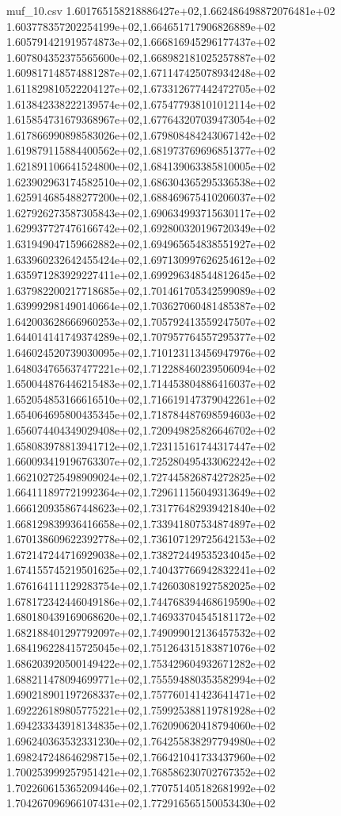 \begin{filecontents*}{muf_10.csv}
1.601765158218886427e+02,1.662486498872076481e+02
1.603778357202254199e+02,1.664651717906826889e+02
1.605791421919574873e+02,1.666816945296177437e+02
1.607804352375565600e+02,1.668982181025257887e+02
1.609817148574881287e+02,1.671147425078934248e+02
1.611829810522204127e+02,1.673312677442472705e+02
1.613842338222139574e+02,1.675477938101012114e+02
1.615854731679368967e+02,1.677643207039473054e+02
1.617866990898583026e+02,1.679808484243067142e+02
1.619879115884400562e+02,1.681973769696851377e+02
1.621891106641524800e+02,1.684139063385810005e+02
1.623902963174582510e+02,1.686304365295336538e+02
1.625914685488277200e+02,1.688469675410206037e+02
1.627926273587305843e+02,1.690634993715630117e+02
1.629937727476166742e+02,1.692800320196720349e+02
1.631949047159662882e+02,1.694965654838551927e+02
1.633960232642455424e+02,1.697130997626254612e+02
1.635971283929227411e+02,1.699296348544812645e+02
1.637982200217718685e+02,1.701461705342599089e+02
1.639992981490140664e+02,1.703627060481485387e+02
1.642003628666960253e+02,1.705792413559247507e+02
1.644014141749374289e+02,1.707957764557295377e+02
1.646024520739030095e+02,1.710123113456947976e+02
1.648034765637477221e+02,1.712288460239506094e+02
1.650044876446215483e+02,1.714453804886416037e+02
1.652054853166616510e+02,1.716619147379042261e+02
1.654064695800435345e+02,1.718784487698594603e+02
1.656074404349029408e+02,1.720949825826646702e+02
1.658083978813941712e+02,1.723115161744317447e+02
1.660093419196763307e+02,1.725280495433062242e+02
1.662102725498909024e+02,1.727445826874272825e+02
1.664111897721992364e+02,1.729611156049313649e+02
1.666120935867448623e+02,1.731776482939421840e+02
1.668129839936416658e+02,1.733941807534874897e+02
1.670138609622392778e+02,1.736107129725642153e+02
1.672147244716929038e+02,1.738272449535234045e+02
1.674155745219501625e+02,1.740437766942832241e+02
1.676164111129283754e+02,1.742603081927582025e+02
1.678172342446049186e+02,1.744768394468619590e+02
1.680180439169068620e+02,1.746933704545181172e+02
1.682188401297792097e+02,1.749099012136457532e+02
1.684196228415725045e+02,1.751264315183871076e+02
1.686203920500149422e+02,1.753429604932671282e+02
1.688211478094699771e+02,1.755594880353582994e+02
1.690218901197268337e+02,1.757760141423641471e+02
1.692226189805775221e+02,1.759925388119781928e+02
1.694233343918134835e+02,1.762090620418794060e+02
1.696240363532331230e+02,1.764255838297794980e+02
1.698247248646298715e+02,1.766421041733437960e+02
1.700253999257951421e+02,1.768586230702767352e+02
1.702260615365209446e+02,1.770751405182681992e+02
1.704267096966107431e+02,1.772916565150053430e+02

\end{filecontents*}
